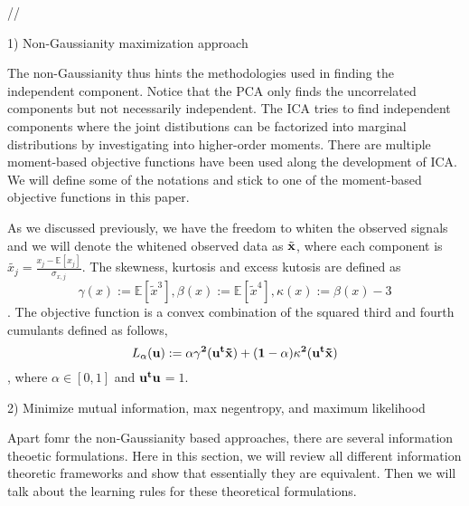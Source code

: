 \documentclass[aps,prl,preprint,superscriptaddress]{revtex4-2}
\begin{document}
//

1) Non-Gaussianity maximization approach

The non-Gaussianity thus hints the methodologies used in finding the independent component. Notice that the PCA only finds the uncorrelated components but not necessarily independent. The ICA tries to find independent components where the joint distibutions can be factorized into marginal distributions by investigating into higher-order moments. There are multiple moment-based objective functions have been used along the development of ICA. We will define some of the notations and stick to one of the moment-based objective functions in this paper.  

As we discussed previously, we have the freedom to whiten the observed signals and we will denote the whitened observed data as $\tilde{\bf{x}}$, where each component is $\tilde{x_{j}} = \frac{x_{j}-\mathbb{E}[x_{j}]}{\sigma_{x,j}}$. The skewness, kurtosis and excess kutosis are defined as $$ \gamma(x) := \mathbb{E}[\tilde{x}^{3}], \beta(x) := \mathbb{E}[\tilde{x}^{4}], \kappa(x) := \beta(x)-3 $$.
The objective function is a convex combination of the squared third and fourth cumulants defined as follows,
\begin{equation}
L_{\alpha}(\bf{u}) := \alpha \gamma^{2}(\bf{u}^{t}\tilde{\bf{x}}) + (1-\alpha)\kappa^{2}(\bf{u}^{t}\tilde{\bf{x}})
\end{equation},
where $\alpha \in [0, 1]$ and $\bf{u}^{t}\bf{u}$$ = 1$.


2) Minimize mutual information, max negentropy, and maximum likelihood

Apart fomr the non-Gaussianity based approaches, there are several information theoetic formulations. Here in this section, we will review all different information theoretic frameworks and show that essentially they are equivalent. Then we will talk about the learning rules for these theoretical formulations. 
\end{document}
